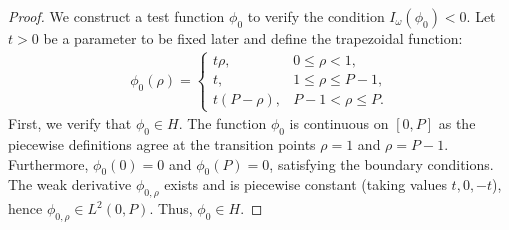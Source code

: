 \documentclass[10pt,a4paper]{amsart}
\begin{document}
	\begin{proof}
		We construct a test function $\phi_0$ to verify the condition $I_{\omega}(\phi_0) < 0$. Let $t > 0$ be a parameter to be fixed later and define the trapezoidal function:
		\begin{align}
			\phi_0(\rho)=\left\{
			\begin{array}{cc}
				t\rho, &0\leq \rho < 1,\\
				t, &1\leq \rho \leq P-1,\\
				t(P-\rho), &P-1 < \rho\leq P.
			\end{array}\right.
		\end{align}
		First, we verify that $\phi_0 \in H$. The function $\phi_0$ is continuous on $[0, P]$ as the piecewise definitions agree at the transition points $\rho=1$ and $\rho=P-1$. Furthermore, $\phi_0(0)=0$ and $\phi_0(P)=0$, satisfying the boundary conditions. The weak derivative $\phi_{0,\rho}$ exists and is piecewise constant (taking values $t, 0, -t$), hence $\phi_{0,\rho} \in L^2(0, P)$. Thus, $\phi_0 \in H$.
		

\end{proof}
\end{document}
